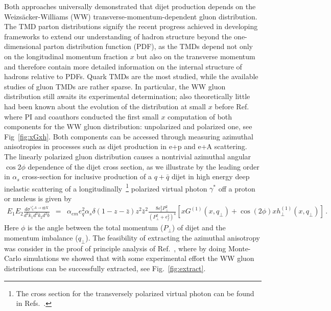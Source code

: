 Both approaches universally demonstrated that  dijet production depends on   
the Weiz\-s\"acker-Williams (WW) transverse-momentum-dependent  gluon distribution.  
The TMD parton distributions signify the recent progress achieved in developing 
frameworks to extend our understanding of hadron structure  beyond the one-dimensional
parton distribution function (PDF), as the TMDs depend not only on the longitudinal momentum 
fraction $x$ but also on the transverse momentum and therefore contain more 
detailed information on the internal structure of hadrons relative to PDFs.
Quark TMDs are the most studied, while the available studies of gluon TMDs 
are rather sparse. In particular, the WW gluon distribution still awaits its experimental 
determination; also theoretically little had been known about the evolution of the distribution at small $x$ 
before Ref.~\cite{Dumitru:2015gaa} where PI and coauthors conducted the first small $x$ computation of 
both components for the WW gluon distribution: unpolarized and polarized one, see Fig~\ref{fig:xGxh}. 
Both components can be accessed through measuring azimuthal anisotropies in processes 
such as dijet production in e+p and e+A scattering. The linearly polarized
gluon distribution causes  a nontrivial azimuthal angular $\cos 2\phi$ dependence of the dijet cross section, 
as we illustrate by the leading order in $\alpha_s$  cross-section for inclusive
production of a $q+\bar q$ dijet in high energy deep inelastic
scattering of a longitudinally~\footnote{The cross section for the transversely polarized virtual photon can be found in Refs.~\cite{Metz:2011wb,Dominguez:2011wm}.} polarized virtual photon $\gamma^*$ off a proton or nucleus is
given by~\cite{Metz:2011wb,Dominguez:2011wm}
\begin{eqnarray}
E_1E_2
\frac{d\sigma ^{\gamma _{L}^{\ast }A\rightarrow q\bar{q}X}}{d^3k_1d^3k_2 d^2b}
&=&\alpha _{em}e_{q}^{2}\alpha _{s}\delta \left( 1-z-\bar z\right) z^2\bar z^2\frac{8\epsilon _{f}^{2}{P}_{\perp }^{2}}{(
{P}_{\perp }^{2}+\epsilon _{f}^{2})^{4}}  %
\left[ xG^{(1)}(x,q_{\perp })+\cos \left(2
  \phi\right)xh_{\perp }^{(1)}(x,q_{\perp })\right]\, .
\label{eq:dijet_L}
\end{eqnarray}
Here $\phi$ is the angle between the total momentum  ($P_\perp$) of dijet and the momentum imbalance  ($q_\perp$).
The feasibility of extracting the azimuthal anisotropy was 
consider in the proof of principle analysis of  Ref.~\cite{TODO}, where by doing Monte-Carlo simulations 
we showed that with some experimental effort the WW gluon distributions can
be successfully extracted, see Fig.~\ref{fig:extract}.

